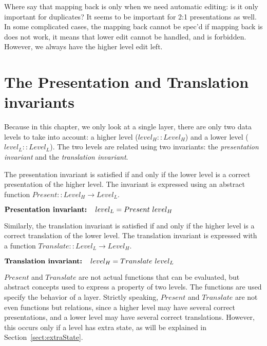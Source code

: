 \bc
Where say that mapping back is only when we need automatic editing: is it only important for duplicates? It seems to be important for 2:1 presentations as well.  In some complicated cases, the mapping back cannot be spec'd if mapping back is does not work, it means that lower edit cannot be handled, and is forbidden. However, we always have the higher level edit left.
\ec

%																
%																
%																
\section{The Presentation and Translation invariants}


Because in this chapter, we only look at a single layer, there are only two data levels to take into account: a higher level ($level_{H} :: Level_{H}$) and a lower level ($level_{L} :: Level_{L}$). The two levels are related using two invariants: the {\em presentation invariant} and the {\em translation invariant}. 

The presentation invariant is satisfied if and only if the lower level is a correct presentation of the higher level. The invariant is expressed using an abstract function 
$Present ::  Level_{H} \rightarrow Level_{L}$.

\begin{small}\begin{math}
\text{\bf Presentation invariant:~~~} level_{L} = Present~level_{H}\\
\end{math}\end{small}

Similarly, the translation invariant is satisfied if and only if the higher level is a correct translation of the lower level. The translation invariant is expressed with a function 
$Translate ::  Level_{L} \rightarrow Level_{H}$.

\begin{small}\begin{math}
\text{\bf Translation invariant:~~~} level_{H} = Translate~level_{L}\\
\end{math}\end{small}

$Present$ and $Translate$ are not actual functions that can be evaluated, but abstract concepts used to express a property of two levels. The functions are used specify the behavior of a layer.
Strictly speaking, $Present$ and $Translate$ are not even functions but relations, since a higher level may have several correct presentations, and a lower level may have several correct translations. However, this occurs only if a level has extra state, as will be explained in Section~\ref{sect:extraState}.

